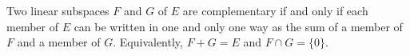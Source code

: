 Two linear subspaces $F$ and $G$ of $E$ are complementary if and only if each member of $E$ can be written in one and only one way as the sum of a member of $F$ and a member of $G$. Equivalently, $F + G = E$ and $F \cap G = \{0\}$.
